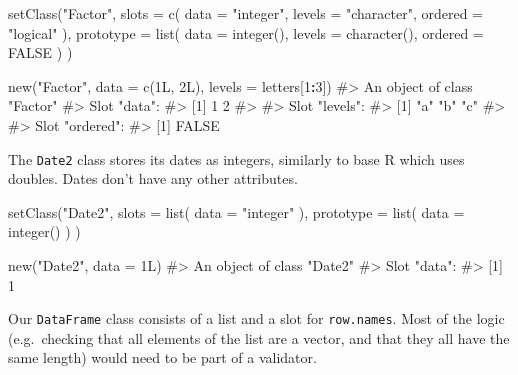 \documentclass[
]{krantz}
\makeatletter
\newenvironment{Shaded}{\begin{snugshade}}{\end{snugshade}}
\newcommand{\CommentTok}[1]{\textcolor[rgb]{0.56,0.35,0.01}{\textit{#1}}}
\newcommand{\DataTypeTok}[1]{\textcolor[rgb]{0.13,0.29,0.53}{#1}}
\newcommand{\DecValTok}[1]{\textcolor[rgb]{0.00,0.00,0.81}{#1}}
\newcommand{\KeywordTok}[1]{\textcolor[rgb]{0.13,0.29,0.53}{\textbf{#1}}}
\newcommand{\NormalTok}[1]{#1}
\newcommand{\OperatorTok}[1]{\textcolor[rgb]{0.81,0.36,0.00}{\textbf{#1}}}
\newcommand{\OtherTok}[1]{\textcolor[rgb]{0.56,0.35,0.01}{#1}}
\newcommand{\StringTok}[1]{\textcolor[rgb]{0.31,0.60,0.02}{#1}}
\newenvironment{kframe}{%
\medskip{}
\setlength{\fboxsep}{.8em}
 \def\at@end@of@kframe{}%
 \ifinner\ifhmode%
  \def\at@end@of@kframe{\end{minipage}}%
  \begin{minipage}{\columnwidth}%
 \fi\fi%
 \def\FrameCommand##1{\hskip\@totalleftmargin \hskip-\fboxsep
 \colorbox{shadecolor}{##1}\hskip-\fboxsep
     \hskip-\linewidth \hskip-\@totalleftmargin \hskip\columnwidth}%
 \MakeFramed {\advance\hsize-\width
   \@totalleftmargin\z@ \linewidth\hsize
   \@setminipage}}%
 {\par\unskip\endMakeFramed%
 \at@end@of@kframe}
\renewenvironment{Shaded}{\begin{kframe}}{\end{kframe}}
\renewcommand{\KeywordTok} [1]{\textcolor[rgb]{0.00,0.44,0.13}{{#1}}}
\renewcommand{\DataTypeTok}[1]{\textcolor[rgb]{0.56,0.13,0.00}{{#1}}}
\renewcommand{\DecValTok}  [1]{\textcolor[rgb]{0.25,0.63,0.44}{{#1}}}
\renewcommand{\StringTok}  [1]{\textcolor[rgb]{0.25,0.44,0.63}{{#1}}}
\renewcommand{\CommentTok} [1]{\textcolor[rgb]{0.38,0.63,0.69}{{#1}}}
\renewcommand{\OtherTok}   [1]{\textcolor[rgb]{0.00,0.44,0.13}{{#1}}}
\renewcommand{\NormalTok}  [1]{{#1}}
\makeatother
\begin{document}
\begin{Shaded}
\begin{Highlighting}[]
\KeywordTok{setClass}\NormalTok{(}\StringTok{"Factor"}\NormalTok{,}
  \DataTypeTok{slots =} \KeywordTok{c}\NormalTok{(}
    \DataTypeTok{data =} \StringTok{"integer"}\NormalTok{,}
    \DataTypeTok{levels =} \StringTok{"character"}\NormalTok{,}
    \DataTypeTok{ordered =} \StringTok{"logical"}
\NormalTok{  ),}
  \DataTypeTok{prototype =} \KeywordTok{list}\NormalTok{(}
    \DataTypeTok{data =} \KeywordTok{integer}\NormalTok{(),}
    \DataTypeTok{levels =} \KeywordTok{character}\NormalTok{(),}
    \DataTypeTok{ordered =} \OtherTok{FALSE}
\NormalTok{  )}
\NormalTok{)}


\KeywordTok{new}\NormalTok{(}\StringTok{"Factor"}\NormalTok{, }\DataTypeTok{data =} \KeywordTok{c}\NormalTok{(1L, 2L), }\DataTypeTok{levels =}\NormalTok{ letters[}\DecValTok{1}\OperatorTok{:}\DecValTok{3}\NormalTok{])}
\CommentTok{#> An object of class "Factor"}
\CommentTok{#> Slot "data":}
\CommentTok{#> [1] 1 2}
\CommentTok{#> }
\CommentTok{#> Slot "levels":}
\CommentTok{#> [1] "a" "b" "c"}
\CommentTok{#> }
\CommentTok{#> Slot "ordered":}
\CommentTok{#> [1] FALSE}
\end{Highlighting}
\end{Shaded}

The \texttt{Date2} class stores its dates as integers, similarly to base R which uses doubles. Dates don't have any other attributes.

\begin{Shaded}
\begin{Highlighting}[]
\KeywordTok{setClass}\NormalTok{(}\StringTok{"Date2"}\NormalTok{,}
  \DataTypeTok{slots =} \KeywordTok{list}\NormalTok{(}
    \DataTypeTok{data =} \StringTok{"integer"}
\NormalTok{  ),}
  \DataTypeTok{prototype =} \KeywordTok{list}\NormalTok{(}
    \DataTypeTok{data =} \KeywordTok{integer}\NormalTok{()}
\NormalTok{  )}
\NormalTok{)}

\KeywordTok{new}\NormalTok{(}\StringTok{"Date2"}\NormalTok{, }\DataTypeTok{data =}\NormalTok{ 1L)}
\CommentTok{#> An object of class "Date2"}
\CommentTok{#> Slot "data":}
\CommentTok{#> [1] 1}
\end{Highlighting}
\end{Shaded}

Our \texttt{DataFrame} class consists of a list and a slot for \texttt{row.names}. Most of the logic (e.g.~checking that all elements of the list are a vector, and that they all have the same length) would need to be part of a validator.
\end{document}
